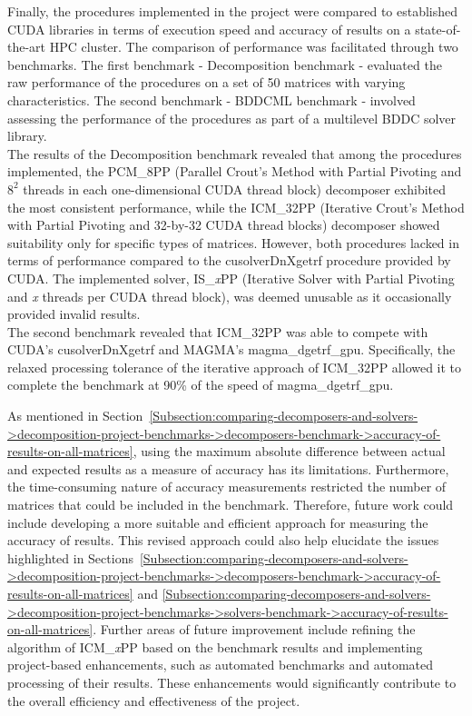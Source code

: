 Finally, the procedures implemented in the project were compared to established CUDA libraries in terms of execution speed and accuracy of results on a state-of-the-art HPC cluster. The comparison of performance was facilitated through two benchmarks. The first benchmark - Decomposition benchmark - evaluated the raw performance of the procedures on a set of 50 matrices with varying characteristics. The second benchmark - BDDCML benchmark - involved assessing the performance of the procedures as part of a multilevel BDDC solver library.\\
The results of the Decomposition benchmark revealed that among the procedures implemented, the PCM\_8PP (Parallel Crout's Method with Partial Pivoting and $8^2$ threads in each one-dimensional CUDA thread block) decomposer exhibited the most consistent performance, while the ICM\_32PP (Iterative Crout's Method with Partial Pivoting and 32-by-32 CUDA thread blocks) decomposer showed suitability only for specific types of matrices. However, both procedures lacked in terms of performance compared to the cusolverDnXgetrf procedure provided by CUDA. The implemented solver, IS\_\textit{x}PP (Iterative Solver with Partial Pivoting and \textit{x} threads per CUDA thread block), was deemed unusable as it occasionally provided invalid results.\\
The second benchmark revealed that ICM\_32PP was able to compete with CUDA's cusolverDnXgetrf and MAGMA's magma\_dgetrf\_gpu. Specifically, the relaxed processing tolerance of the iterative approach of ICM\_32PP allowed it to complete the benchmark at 90\% of the speed of magma\_dgetrf\_gpu.

As mentioned in Section~\ref{Subsection:comparing-decomposers-and-solvers->decomposition-project-benchmarks->decomposers-benchmark->accuracy-of-results-on-all-matrices}, using the maximum absolute difference between actual and expected results as a measure of accuracy has its limitations. Furthermore, the time-consuming nature of accuracy measurements restricted the number of matrices that could be included in the benchmark. Therefore, future work could include developing a more suitable and efficient approach for measuring the accuracy of results. This revised approach could also help elucidate the issues highlighted in Sections~\ref{Subsection:comparing-decomposers-and-solvers->decomposition-project-benchmarks->decomposers-benchmark->accuracy-of-results-on-all-matrices} and \ref{Subsection:comparing-decomposers-and-solvers->decomposition-project-benchmarks->solvers-benchmark->accuracy-of-results-on-all-matrices}. Further areas of future improvement include refining the algorithm of ICM\_\textit{x}PP based on the benchmark results and implementing project-based enhancements, such as automated benchmarks and automated processing of their results. These enhancements would significantly contribute to the overall efficiency and effectiveness of the project.